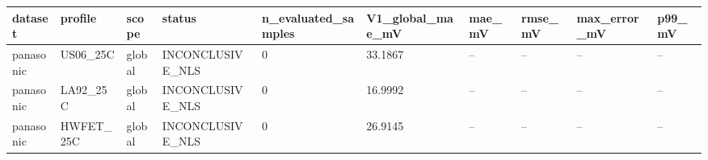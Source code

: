 \begin{tabular}{llllllllll}
\hline
dataset & profile & scope & status & n\_evaluated\_samples & V1\_global\_mae\_mV & mae\_mV & rmse\_mV & max\_error\_mV & p99\_mV \\
\hline
panasonic & US06\_25C & global & INCONCLUSIVE\_NLS & 0 & 33.1867 & -- & -- & -- & -- \\
panasonic & LA92\_25C & global & INCONCLUSIVE\_NLS & 0 & 16.9992 & -- & -- & -- & -- \\
panasonic & HWFET\_25C & global & INCONCLUSIVE\_NLS & 0 & 26.9145 & -- & -- & -- & -- \\
\hline
\end{tabular}
